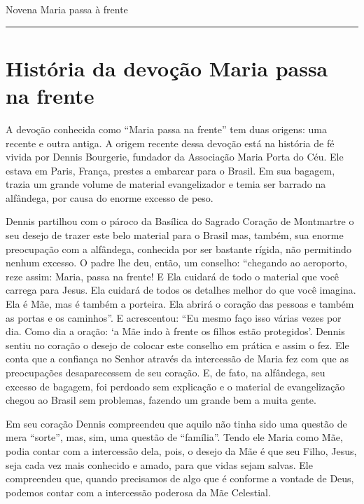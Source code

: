 \documentclass[a4paper,14pt]{extarticle} \usepackage[utf8]{inputenc}
\begin{document}
\begin{center}
  {\huge Novena Maria passa à frente}
\end{center}


\par\noindent\rule{\textwidth}{0.4pt}

\tableofcontents
\thispagestyle{empty}

\newpage

\section{História da devoção Maria passa na frente}

A devoção conhecida como “Maria passa na frente” tem duas origens: uma recente e outra antiga. A origem recente dessa devoção está na história de fé vivida por Dennis Bourgerie, fundador da Associação Maria Porta do Céu. Ele estava em Paris, França, prestes a embarcar para o Brasil. Em sua bagagem, trazia um grande volume de material evangelizador e temia ser barrado na alfândega, por causa do enorme excesso de peso.

Dennis partilhou com o pároco da Basílica do Sagrado Coração de Montmartre o seu desejo de trazer este belo material para o Brasil mas, também, sua enorme preocupação com a alfândega, conhecida por ser bastante rígida, não permitindo nenhum excesso. O padre lhe deu, então, um conselho: “chegando ao aeroporto, reze assim: Maria, passa na frente! E Ela cuidará de todo o material que você carrega para Jesus. Ela cuidará de todos os detalhes melhor do que você imagina. Ela é Mãe, mas é também a porteira. Ela abrirá o coração das pessoas e também as portas e os caminhos”. E acrescentou: “Eu mesmo faço isso várias vezes por dia. Como dia a oração: ‘a Mãe indo à frente os filhos estão protegidos’. Dennis sentiu no coração o desejo de colocar este conselho em prática e assim o fez. Ele conta que a confiança no Senhor através da intercessão de Maria fez com que as preocupações desaparecessem de seu coração. E, de fato, na alfândega, seu excesso de bagagem, foi perdoado sem explicação e o material de evangelização chegou ao Brasil sem problemas, fazendo um grande bem a muita gente.

Em seu coração Dennis compreendeu que aquilo não tinha sido uma questão de mera “sorte”, mas, sim, uma questão de “família”. Tendo ele Maria como Mãe, podia contar com a intercessão dela, pois, o desejo da Mãe é que seu Filho, Jesus, seja cada vez mais conhecido e amado, para que vidas sejam salvas. Ele compreendeu que, quando precisamos de algo que é conforme a vontade de Deus, podemos contar com a intercessão poderosa da Mãe Celestial.
\end{document}
